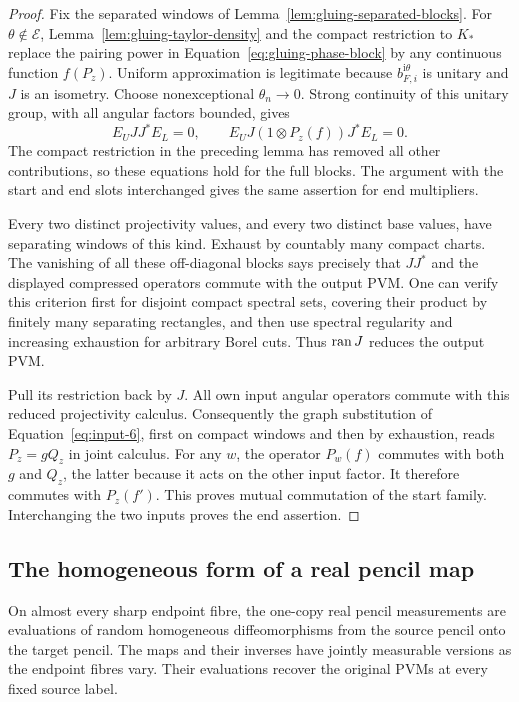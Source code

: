 \begin{proof}
Fix the separated windows of
Lemma~\ref{lem:gluing-separated-blocks}.  For
$\theta\notin\mathcal E$, Lemma~\ref{lem:gluing-taylor-density}
and the compact restriction to $K_*$ replace the pairing power
in Equation~\eqref{eq:gluing-phase-block} by any continuous
function $f(P_z)$.  Uniform approximation is legitimate because
$b_{F,i}^{\mathrm i\theta}$ is unitary and $J$ is an isometry.
Choose nonexceptional $\theta_n\to0$.  Strong continuity of this
unitary group, with all angular factors bounded, gives
\[
 E_UJJ^*E_L=0,
 \qquad
 E_UJ(1\otimes P_z(f))J^*E_L=0.
\]
The compact restriction in the preceding lemma has removed all
other contributions, so these equations hold for the full blocks.
The argument with the start and end slots interchanged gives the
same assertion for end multipliers.

Every two distinct projectivity values, and every two distinct
base values, have separating windows of this kind.  Exhaust by
countably many compact charts.  The vanishing of all these
off-diagonal blocks says precisely that $JJ^*$ and the displayed
compressed operators commute with the output PVM.  One can verify
this criterion first for disjoint compact spectral sets, covering
their product by finitely many separating rectangles, and then
use spectral regularity and increasing exhaustion for arbitrary
Borel cuts.  Thus $\operatorname{ran} J$ reduces the output PVM.

Pull its restriction back by $J$.  All own input angular operators
commute with this reduced projectivity calculus.  Consequently
the graph substitution of Equation~\eqref{eq:input-6}, first on
compact windows and then by exhaustion, reads $P_z=gQ_z$ in
joint calculus.  For any $w$, the operator $P_w(f)$ commutes with
both $g$ and $Q_z$, the latter because it acts on the other input
factor.  It therefore commutes with $P_z(f')$.  This proves
mutual commutation of the start family.  Interchanging the two
inputs proves the end assertion.
\end{proof}

\subsection{The homogeneous form of a real pencil map}

\begin{proposition}
\label{prop:gluing-homogeneous-pencil}
On almost every sharp endpoint fibre, the one-copy real pencil
measurements are evaluations of random homogeneous
diffeomorphisms from the source pencil onto the target pencil.
The maps and their inverses have jointly measurable versions as
the endpoint fibres vary.  Their evaluations recover the
original PVMs at every fixed source label.
\end{proposition}

